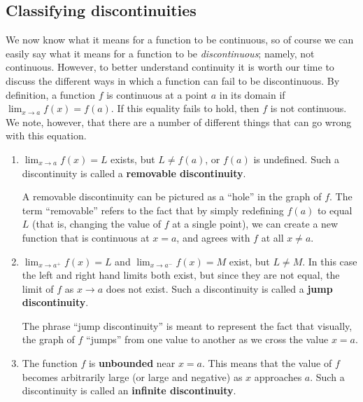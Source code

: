 \subsection*{Classifying discontinuities}
We now know what it means for a function to be continuous, so of course we can easily say what it means for a function to be \textit{discontinuous}; namely, not continuous. However, to better understand continuity it is worth our time to discuss the different ways in which a function can fail to be discontinuous. By definition, a function $f$ is continuous at a point $a$ in its domain if $\displaystyle \lim_{x\to a}f(x) = f(a)$. If this equality fails to hold, then $f$ is not continuous. We note, however, that there are a number of different things that can go wrong with this equation.
\begin{enumerate}
\item $\displaystyle \lim_{x\to a}f(x)=L$ exists, but $L\neq f(a)$, or $f(a)$ is undefined. Such a discontinuity is called a \textbf{removable discontinuity}.

A removable discontinuity can be pictured as a ``hole'' in the graph of $f$. The term ``removable'' refers to the fact that by simply redefining $f(a)$ to equal $L$ (that is, changing the value of $f$ at a single point), we can create a new function that is continuous at $x=a$, and agrees with $f$ at all $x\neq a$.



\item $\displaystyle \lim_{x\to a^+}f(x) = L$ and $\displaystyle \lim_{x\to a^-}f(x)=M$ exist, but $L\neq M$. In this case the left and right hand limits both exist, but since they are not equal, the limit of $f$ as $x\to a$ does not exist. Such a discontinuity is called a \textbf{jump discontinuity}.

The phrase ``jump discontinuity'' is meant to represent the fact that visually, the graph of $f$ ``jumps'' from one value to another as we cross the value $x=a$.


\item The function $f$ is \textbf{unbounded} near $x=a$. This means that the value of $f$ becomes arbitrarily large (or large and negative) as $x$ approaches $a$. Such a discontinuity is called an \textbf{infinite discontinuity}.



\end{enumerate}
